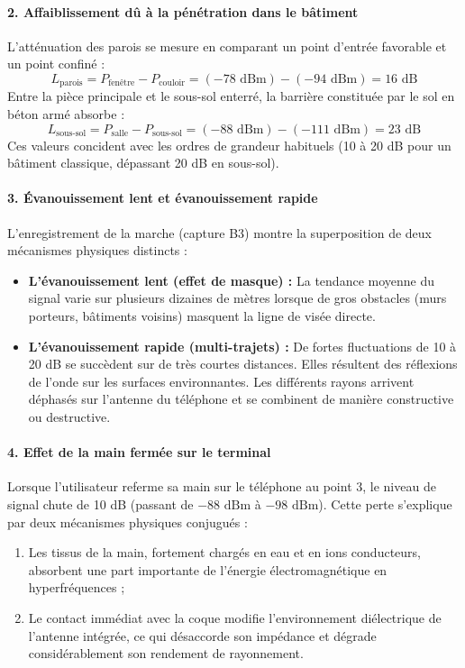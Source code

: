 \documentclass[11pt,a4paper]{article}
\begin{document}
\paragraph{2. Affaiblissement d\^u \`a la p\'en\'etration dans le b\^atiment}
L'att\'enuation des parois se mesure en comparant un point d'entr\'ee favorable et un point confin\'e :
\begin{equation}
    L_{\text{parois}} = P_{\text{fen\^etre}} - P_{\text{couloir}} = (-78\text{ dBm}) - (-94\text{ dBm}) = 16\text{ dB}
\end{equation}
Entre la pi\`ece principale et le sous-sol enterr\'e, la barri\`ere constitu\'ee par le sol en b\'eton arm\'e absorbe :
\begin{equation}
    L_{\text{sous-sol}} = P_{\text{salle}} - P_{\text{sous-sol}} = (-88\text{ dBm}) - (-111\text{ dBm}) = 23\text{ dB}
\end{equation}
Ces valeurs concident avec les ordres de grandeur habituels (10 \`a 20 dB pour un b\^atiment classique, d\'epassant 20 dB en sous-sol).

\paragraph{3. \'Evanouissement lent et \'evanouissement rapide}
L'enregistrement de la marche (capture B3) montre la superposition de deux m\'ecanismes physiques distincts :
\begin{itemize}
    \item \textbf{L'\'evanouissement lent (effet de masque) :} La tendance moyenne du signal varie sur plusieurs dizaines de m\`etres lorsque de gros obstacles (murs porteurs, b\^atiments voisins) masquent la ligne de vis\'ee directe.
    \item \textbf{L'\'evanouissement rapide (multi-trajets) :} De fortes fluctuations de 10 \`a 20 dB se succ\`edent sur de tr\`es courtes distances. Elles r\'esultent des r\'eflexions de l'onde sur les surfaces environnantes. Les diff\'erents rayons arrivent d\'ephas\'es sur l'antenne du t\'el\'ephone et se combinent de mani\`ere constructive ou destructive.
\end{itemize}

\paragraph{4. Effet de la main ferm\'ee sur le terminal}
Lorsque l'utilisateur referme sa main sur le t\'el\'ephone au point 3, le niveau de signal chute de 10 dB (passant de $-88\text{ dBm}$ \`a $-98\text{ dBm}$). Cette perte s'explique par deux m\'ecanismes physiques conjugu\'es :
\begin{enumerate}
    \item Les tissus de la main, fortement charg\'es en eau et en ions conducteurs, absorbent une part importante de l'\'energie \'electromagn\'etique en hyperfr\'equences ;
    \item Le contact imm\'ediat avec la coque modifie l'environnement di\'electrique de l'antenne int\'egr\'ee, ce qui d\'esaccorde son imp\'edance et d\'egrade consid\'erablement son rendement de rayonnement.
\end{enumerate}
\end{document}
